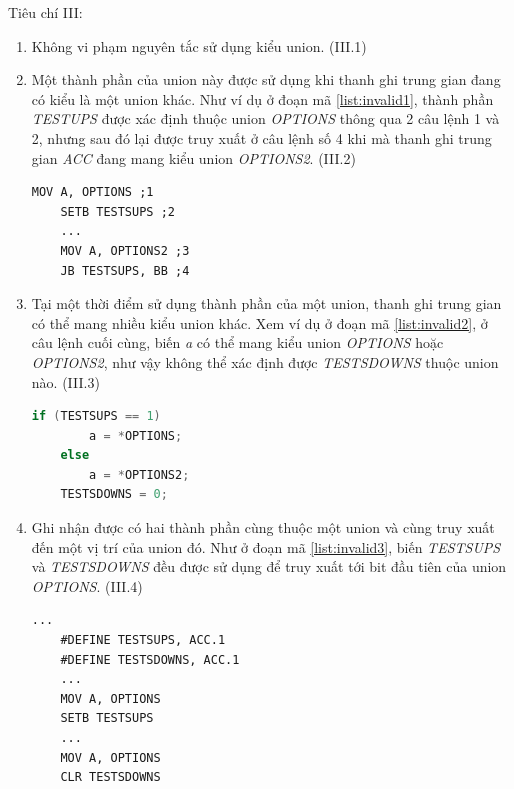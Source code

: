 Tiêu chí III:
\begin{enumerate}
	\item Không vi phạm nguyên tắc sử dụng kiểu union. (III.1)
	\item Một thành phần của union này được sử dụng khi thanh ghi trung gian đang có kiểu là một union khác. Như ví dụ ở đoạn mã \ref{list:invalid1}, thành phần \textit{TESTUPS} được xác định thuộc union \textit{OPTIONS} thông qua 2 câu lệnh 1 và 2, nhưng sau đó lại được truy xuất ở câu lệnh số 4 khi mà thanh ghi trung gian \textit{ACC} đang mang kiểu union \textit{OPTIONS2}. (III.2)
	\begin{lstlisting}[caption={Đoạn mã có một biến bit thuộc nhiều bộ biến khác nhau},label={list:invalid1}]
	MOV A, OPTIONS ;1
	SETB TESTSUPS ;2
	...
	MOV A, OPTIONS2 ;3
	JB TESTSUPS, BB ;4
	\end{lstlisting}
	\item Tại một thời điểm sử dụng thành phần của một union, thanh ghi trung gian có thể mang nhiều kiểu union khác. Xem ví dụ ở đoạn mã \ref{list:invalid2}, ở câu lệnh cuối cùng, biến \textit{a} có thể mang kiểu union \textit{OPTIONS} hoặc \textit{OPTIONS2}, như vậy không thể xác định được \textit{TESTSDOWNS} thuộc union nào. (III.3)
	\begin{lstlisting}[caption={Đoạn mã ACC có thể mang nhiều giá trị vùng nhớ khác nhau},label={list:invalid2}, language=c++]
	if (TESTSUPS == 1)
		a = *OPTIONS;
	else
		a = *OPTIONS2;
	TESTSDOWNS = 0;
	\end{lstlisting}
	\item Ghi nhận được có hai thành phần cùng thuộc một union và cùng truy xuất đến một vị trí của union đó. Như ở đoạn mã \ref{list:invalid3}, biến \textit{TESTSUPS} và \textit{TESTSDOWNS} đều được sử dụng để truy xuất tới bit đầu tiên của union \textit{OPTIONS}. (III.4)
	\begin{lstlisting}[caption={Đoạn mã có 2 thành phần union cùng truy xuất đến một vị trí vùng nhớ của union đó},label={list:invalid3}]
	...
	#DEFINE TESTSUPS, ACC.1
	#DEFINE TESTSDOWNS, ACC.1
	...
	MOV A, OPTIONS
	SETB TESTSUPS
	...
	MOV A, OPTIONS
	CLR TESTSDOWNS
	\end{lstlisting}
\end{enumerate}

